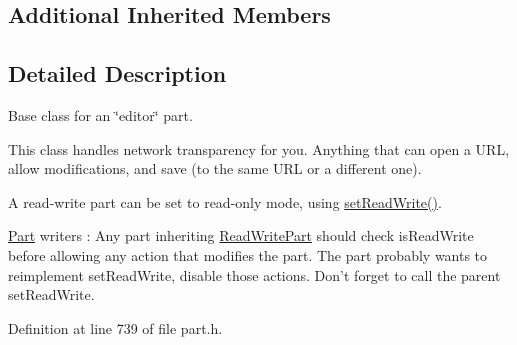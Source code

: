 \subsection*{Additional Inherited Members}


\subsection{Detailed Description}
Base class for an \char`\"{}editor\char`\"{} part.

This class handles network transparency for you. Anything that can open a U\+R\+L, allow modifications, and save (to the same U\+R\+L or a different one).

A read-\/write part can be set to read-\/only mode, using \hyperlink{classKParts_1_1ReadWritePart_a5b8c2d4b35739c882dc67f0acf8096c2}{set\+Read\+Write()}.

\hyperlink{classKParts_1_1Part}{Part} writers \+: Any part inheriting \hyperlink{classKParts_1_1ReadWritePart}{Read\+Write\+Part} should check is\+Read\+Write before allowing any action that modifies the part. The part probably wants to reimplement set\+Read\+Write, disable those actions. Don't forget to call the parent set\+Read\+Write. 

Definition at line 739 of file part.\+h.




